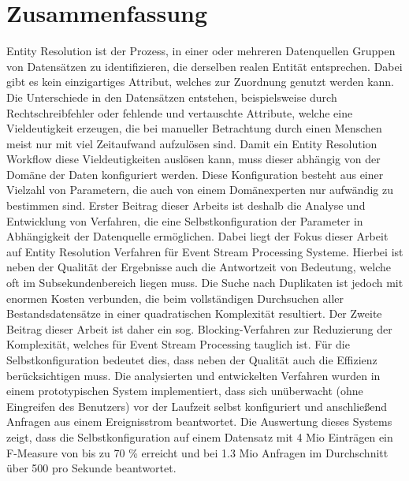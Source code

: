 %
\chapter*{Zusammenfassung}
\label{sec:abstract}
\vspace*{-10mm}

Entity Resolution ist der Prozess, in einer oder mehreren Datenquellen
Gruppen von Datensätzen zu identifizieren, die derselben realen Entität
entsprechen. Dabei gibt es kein einzigartiges Attribut, welches zur
Zuordnung genutzt werden kann. Die Unterschiede in den Datensätzen
entstehen, beispielsweise durch Rechtschreibfehler oder fehlende und
vertauschte Attribute, welche eine Vieldeutigkeit erzeugen, die bei
manueller Betrachtung durch einen Menschen meist nur mit viel Zeitaufwand
aufzulösen sind. Damit ein Entity Resolution Workflow diese
Vieldeutigkeiten auslösen kann, muss dieser abhängig von der Domäne der
Daten konfiguriert werden. Diese Konfiguration besteht aus einer Vielzahl
von Parametern, die auch von einem Domänexperten nur aufwändig zu
bestimmen sind. Erster Beitrag dieser Arbeits ist deshalb die Analyse und
Entwicklung von Verfahren, die eine Selbstkonfiguration der Parameter in
Abhängigkeit der Datenquelle ermöglichen. Dabei liegt der Fokus dieser
Arbeit auf Entity Resolution Verfahren für Event Stream Processing
Systeme. Hierbei ist neben der Qualität der Ergebnisse auch die
Antwortzeit von Bedeutung, welche oft im Subsekundenbereich liegen muss.
Die Suche nach Duplikaten ist jedoch mit enormen Kosten verbunden, die
beim vollständigen Durchsuchen aller Bestandsdatensätze in einer
quadratischen Komplexität resultiert. Der Zweite Beitrag dieser Arbeit
ist daher ein sog. Blocking-Verfahren zur Reduzierung der Komplexität,
welches für Event Stream Processing tauglich ist. Für die
Selbstkonfiguration bedeutet dies, dass neben der Qualität auch die
Effizienz berücksichtigen muss. Die analysierten und entwickelten
Verfahren wurden in einem prototypischen System implementiert, dass sich
unüberwacht (ohne Eingreifen des Benutzers) vor der Laufzeit selbst
konfiguriert und anschließend Anfragen aus einem Ereignisstrom
beantwortet. Die Auswertung dieses Systems zeigt, dass die
Selbstkonfiguration auf einem Datensatz mit 4 Mio Einträgen ein F-Measure
von bis zu 70 \% erreicht und bei 1.3 Mio Anfragen im Durchschnitt über
500 pro Sekunde beantwortet.
